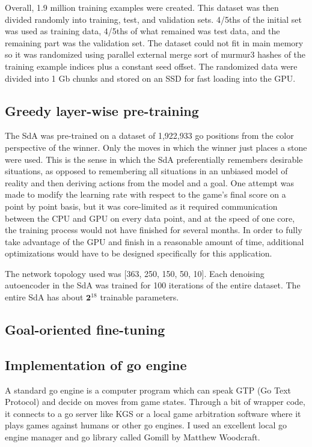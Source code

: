 \documentclass[12pt]{article}
\begin{document}
Overall, 1.9 million training examples were created. This dataset was then divided randomly into training, test, and validation sets. 4/5ths of the initial set was used as training data, 4/5ths of what remained was test data, and the remaining part was the validation set. The dataset could not fit in main memory so it was randomized using parallel external merge sort of murmur3 hashes of the training example indices plus a constant seed offset. The randomized data were divided into 1 Gb chunks and stored on an SSD for fast loading into the GPU.
	
	\subsection{Greedy layer-wise pre-training}

The SdA was pre-trained on a dataset of 1,922,933 go positions from the color perspective of the winner. Only the moves in which the winner just places a stone were used. This is the sense in which the SdA preferentially remembers desirable situations, as opposed to remembering all situations in an unbiased model of reality and then deriving actions from the model and a goal. One attempt was made to modify the learning rate with respect to the game's final score on a point by point basis, but it was core-limited as it required communication between the CPU and GPU on every data point, and at the speed of one core, the training process would not have finished for several months. In order to fully take advantage of the GPU and finish in a reasonable amount of time, additional optimizations would have to be designed specifically for this application.

The network topology used was [363, 250, 150, 50, 10]. Each denoising autoencoder in the SdA was trained for 100 iterations of the entire dataset. The entire SdA has about $\mathbf 2^{18}$ trainable parameters.
	
	\subsection{Goal-oriented fine-tuning}


	
	\subsection{Implementation of go engine}

A standard go engine is a computer program which can speak GTP (Go Text Protocol) and decide on moves from game states. Through a bit of wrapper code, it connects to a go server like KGS or a local game arbitration software where it plays games against humans or other go engines. I used an excellent local go engine manager and go library called Gomill by Matthew Woodcraft. %
\end{document}
